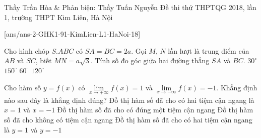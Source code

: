 
\begin{name}
{Thầy Trần Hòa \& Phản biện: Thầy Tuấn Nguyễn}
{Đề thi thử THPTQG 2018, lần 1, trường THPT Kim Liên, Hà Nội}
\end{name}
\setcounter{ex}{0}\setcounter{bt}{0}
[ans/ans-2-GHK1-91-KimLien-L1-HaNoi-18]
\begin{ex}%
Cho hình chóp $S.ABC$ có $SA=BC=2a$. Gọi $M$, $N$ lần lượt là trung điểm của $AB$ và $SC$, biết $MN=a\sqrt{3}$. Tính số đo góc giữa hai đường thẳng $SA$ và $BC$.
\choice
{$30^\circ$}
{$150^\circ$}
{\True $60^\circ$}
{$120^\circ$}
\end{ex}
\begin{ex}%
Cho hàm số $y=f(x)$ có   $\underset{x\to +\infty}{\lim} f(x)=1$ và  $\underset{x\to -\infty}{\lim} f(x)=-1$. Khẳng định nào sau đây là khẳng định đúng?
\choice
{Đồ thị hàm số đã cho có hai tiệm cận ngang là $x=1$ và $x=-1$}
{Đồ thị hàm số đã cho có đúng một tiệm cận ngang}
{Đồ thị hàm số đã cho không có tiệm cận ngang}
{\True Đồ thị hàm số đã cho có hai tiệm cận ngang là $y=1$ và $y=-1$}
\end{ex}
